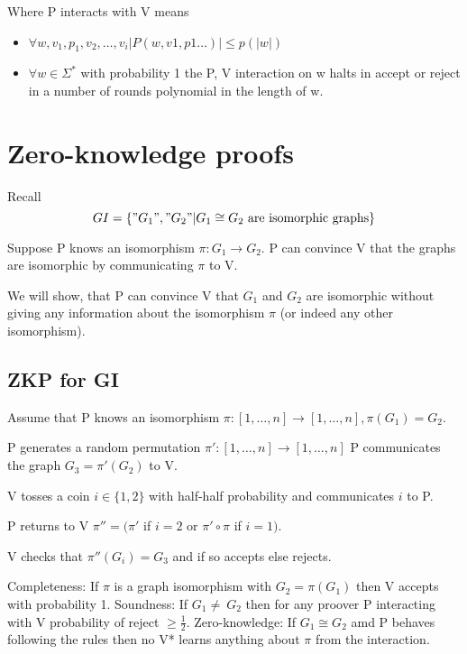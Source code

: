 \documentclass[a4paper,12pt]{article}
\theoremstyle{definition}
\theoremstyle{remark}
\begin{document}
Where P interacts with V means
\begin{itemize}
    \item $\forall w, v_1, p_1, v_2, \dots, v_i | P(w, v1, p1 \dots) | \leq p(|w|)$
    \item $\forall w \in \Sigma^* $ with probability 1 the P, V interaction on w halts in accept or reject in a number of rounds 
    polynomial in the length of w.
\end{itemize}







\newpage
\section{Zero-knowledge proofs}

Recall
\begin{equation*}
    GI = \{"G_1", "G_2" | G_1 \cong G_2 \text{ are isomorphic graphs}\}
\end{equation*}

Suppose P knows an isomorphism $\pi: G_1 \to G_2$. P can convince V that the graphs are isomorphic by 
communicating $\pi$ to V.

We will show, that P can convince V that $G_1$ and $G_2$ are isomorphic without giving any information about the isomorphism
$\pi$ (or indeed any other isomorphism).

\subsection{ZKP for GI}
Assume that P knows an isomorphism $\pi: [1, \dots, n] \to [1, \dots, n], \pi (G_1) = G_2$.

P generates a random permutation $\pi': [1, \dots, n] \to [1, \dots, n]$
P communicates the graph $G_3 = \pi'(G_2)$ to V.

V tosses a coin $i \in \{1, 2\}$ with half-half probability and communicates $i$ to P.

P returns to V $\pi'' = (\pi'$ if $i = 2$ or $\pi' \circ \pi$ if $i = 1)$.

V checks that $\pi''(G_i) = G_3$ and if so accepts else rejects.

Completeness: If $\pi$ is a graph isomorphism with $G_2 = \pi(G_1)$ then V accepts with probability 1.
Soundness: If $G_1 \neq~ G_2$ then for any proover P interacting with V probability of reject $\geq \frac{1}{2}$.
Zero-knowledge: If $G_1 \cong G_2$ amd P behaves following the rules then no V* learns anything about $\pi$ from the interaction.
\end{document}
